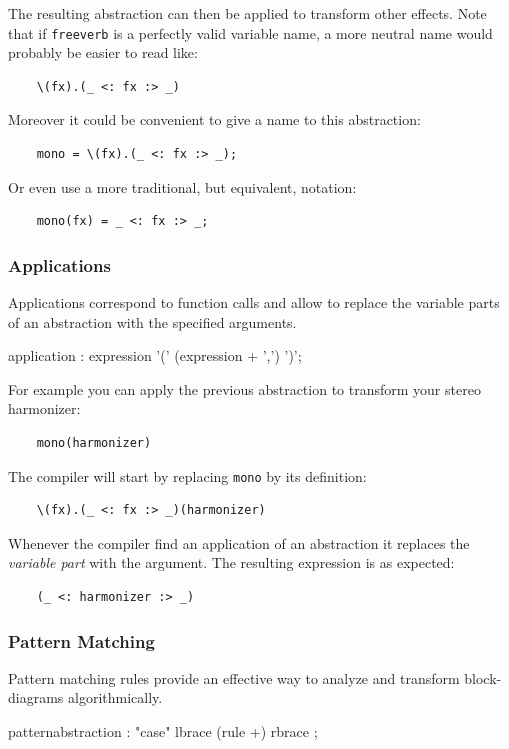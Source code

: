 The resulting abstraction can then be applied to transform other effects. Note that if \lstinline'freeverb' is a perfectly valid variable name, a more neutral name would probably be easier to read like:
\begin{lstlisting}
	\(fx).(_ <: fx :> _)
\end{lstlisting}
 
Moreover it could be convenient to give a name to this abstraction:
\begin{lstlisting}
	mono = \(fx).(_ <: fx :> _);
\end{lstlisting}

Or even use a more traditional, but equivalent, notation:
\begin{lstlisting}
	mono(fx) = _ <: fx :> _;
\end{lstlisting}

\subsubsection{Applications}
Applications correspond to function calls and allow to replace the variable parts of an abstraction with the specified arguments.

\begin{rail}
application : expression '(' (expression + ',') ')';
\end{rail}   

For example you can apply the previous abstraction to transform your stereo harmonizer:
\begin{lstlisting}
	mono(harmonizer)
\end{lstlisting}

The compiler will start by replacing \lstinline'mono' by its definition:
\begin{lstlisting}
	\(fx).(_ <: fx :> _)(harmonizer)
\end{lstlisting}

Whenever the \faust compiler find an application of an abstraction it replaces the \emph{variable part} with the argument. The resulting expression is as expected:
\begin{lstlisting}
	(_ <: harmonizer :> _)
\end{lstlisting}

\subsubsection{Pattern Matching}
Pattern matching rules provide an effective way to analyze and transform block-diagrams algorithmically.
\begin{rail}
patternabstraction :  "case" lbrace (rule +) rbrace ;
\end{rail}

